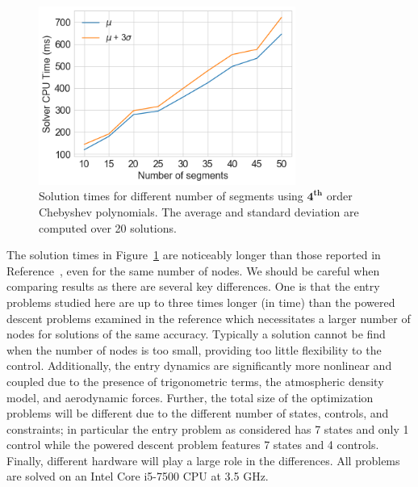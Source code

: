 \documentclass[letterpaper, preprint, paper,11pt]{AAS}	%
\begin{document}
	
				\begin{figure}
					\centering
					\includegraphics[width=0.75\textwidth,keepaspectratio=true]{solver_times}
					\caption{Solution times for different number of segments using $ \mathbf{4^{th}} $ order Chebyshev polynomials. The average and standard deviation are computed over 20 solutions.}				
					\label{plot_solution_times}
				\end{figure}
	The solution times in Figure~\ref{plot_solution_times} are noticeably longer than those reported in Reference~, even for the same number of nodes. We should be careful when comparing results as there are several key differences. One is that the entry problems studied here are up to three times longer (in time) than the powered descent problems examined in the reference which necessitates a larger number of nodes for solutions of the same accuracy. Typically a solution cannot be find when the number of nodes is too small, providing too little flexibility to the control. Additionally, the entry dynamics are significantly more nonlinear and coupled due to the presence of trigonometric terms, the atmospheric density model, and aerodynamic forces. Further, the total size of the optimization problems will be different due to the different number of states, controls, and constraints; in particular the entry problem as considered has 7 states and only 1 control while the powered descent problem features 7 states and 4 controls. Finally, different hardware will play a large role in the differences. All problems are solved on an Intel Core i5-7500 CPU at 3.5 GHz.
	
	
\end{document}
